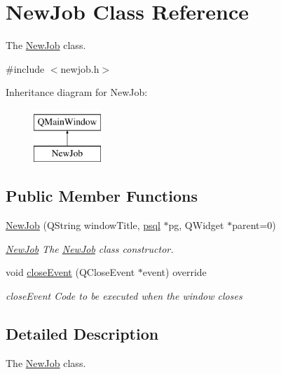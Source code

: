 \hypertarget{class_new_job}{}\section{New\+Job Class Reference}
\label{class_new_job}


The \mbox{\hyperlink{class_new_job}{New\+Job}} class.  




{\ttfamily \#include $<$newjob.\+h$>$}

Inheritance diagram for New\+Job\+:\begin{figure}[H]
\begin{center}
\leavevmode
\includegraphics[height=2.000000cm]{class_new_job}
\end{center}
\end{figure}
\subsection*{Public Member Functions}
\begin{DoxyCompactItemize}
\item 
\mbox{\hyperlink{class_new_job_a489279a9ec91bcac74d7dad65eb2f85a}{New\+Job}} (Q\+String window\+Title, \mbox{\hyperlink{classpsql}{psql}} $\ast$pg, Q\+Widget $\ast$parent=0)
\begin{DoxyCompactList}\small\item\em \mbox{\hyperlink{class_new_job}{New\+Job}} The \mbox{\hyperlink{class_new_job}{New\+Job}} class constructor. \end{DoxyCompactList}\item 
void \mbox{\hyperlink{class_new_job_a84f6390f63ce01fb860b375f53f9c68d}{close\+Event}} (Q\+Close\+Event $\ast$event) override
\begin{DoxyCompactList}\small\item\em close\+Event Code to be executed when the window closes \end{DoxyCompactList}\end{DoxyCompactItemize}


\subsection{Detailed Description}
The \mbox{\hyperlink{class_new_job}{New\+Job}} class. 

